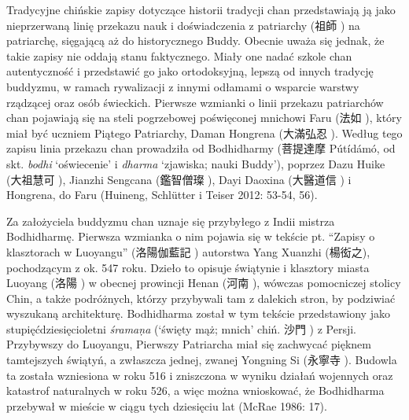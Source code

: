 Tradycyjne chińskie zapisy dotyczące historii tradycji chan przedstawiają ją jako nieprzerwaną linię przekazu nauk i doświadczenia z patriarchy (祖師 ) na patriarchę, sięgającą aż do historycznego Buddy.
Obecnie uważa się jednak, że takie zapisy nie oddają stanu faktycznego.
Miały one nadać szkole chan autentyczność i przedstawić go jako ortodoksyjną, lepszą od innych tradycję buddyzmu, w ramach rywalizacji z innymi odłamami o wsparcie warstwy rządzącej oraz osób świeckich.
Pierwsze wzmianki o linii przekazu patriarchów chan pojawiają się na steli pogrzebowej poświęconej mnichowi Faru (法如 ), który miał być uczniem Piątego Patriarchy, Daman Hongrena (大滿弘忍 ).
Według tego zapisu linia przekazu chan prowadziła od Bodhidharmy (菩提達摩 Pútídámó, od skt. \textit{bodhi} `oświecenie' i \textit{dharma} `zjawiska; nauki Buddy'), poprzez Dazu Huike  (大祖慧可 ), Jianzhi Sengcana (鑑智僧璨 ), Dayi Daoxina (大醫道信 ) i Hongrena, do Faru
(Huineng, Schlütter i Teiser 2012: 53-54, 56).

Za założyciela buddyzmu chan uznaje się przybyłego z Indii mistrza Bodhidharmę.
Pierwsza wzmianka o nim pojawia się w tekście pt. ``Zapisy o klasztorach w Luoyangu'' (洛陽伽藍記 ) autorstwa Yang Xuanzhi (楊衒之), pochodzącym z ok. 547 roku.
Dzieło to opisuje świątynie i klasztory miasta Luoyang (洛陽 ) w obecnej prowincji Henan (河南 ), wówczas pomocniczej stolicy Chin, a także podróżnych, którzy przybywali tam z dalekich stron, by podziwiać wyszukaną architekturę.
Bodhidharma został w tym tekście przedstawiony jako stupięćdziesięcioletni \textit{śrama\d{n}a} (`święty mąż; mnich' chiń. 沙門 ) z Persji.
Przybywszy do Luoyangu, Pierwszy Patriarcha miał się zachwycać pięknem tamtejszych świątyń, a zwłaszcza jednej, zwanej Yongning Si (永寧寺 ).
Budowla ta została wzniesiona w roku 516 i zniszczona w wyniku działań wojennych oraz katastrof naturalnych w roku 526, a więc można wnioskować, że Bodhidharma przebywał w mieście w ciągu tych dziesięciu lat
(McRae 1986: 17).

